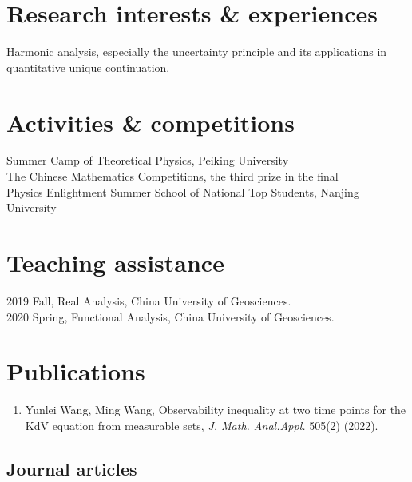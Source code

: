 \documentclass[11pt]{article} %
\begin{document}

\section*{Research interests \& experiences}
Harmonic analysis, especially the uncertainty principle and its applications in quantitative unique continuation. 

\section*{Activities \& competitions}
 Summer Camp of Theoretical Physics, Peiking University\\
 The Chinese Mathematics Competitions, the third prize  in the final\\
 Physics Enlightment Summer School of National Top Students, Nanjing University


\section*{Teaching assistance}
2019 Fall, Real Analysis, China University of Geosciences. \\
2020 Spring, Functional Analysis, China University of Geosciences.

\section*{Publications}
\begin{enumerate}
\leftskip-0.13in
\item Yunlei Wang, Ming Wang, Observability inequality at two time points for the KdV equation from measurable sets, \emph{J. Math. Anal.Appl.} 505(2) (2022).
\end{enumerate}
\iffalse
\subsection*{Journal articles}
\end{document}
